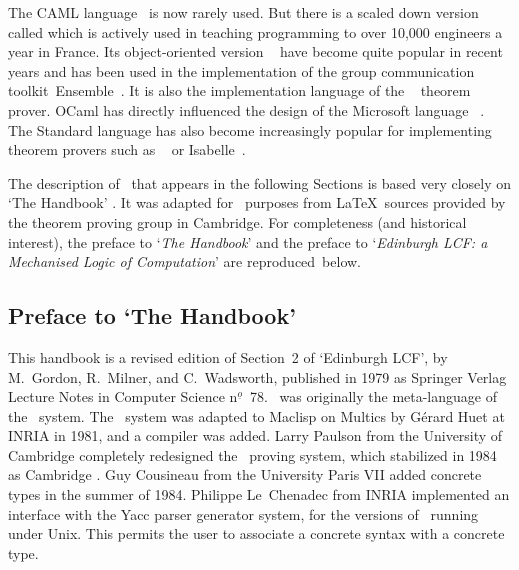 \documentclass[11pt]{article}
\begin{document}
The {\sf CAML} language~\cite{tr:CousineauHuet90a,tr:Weis+90a} is now rarely
used. But there is a scaled down version called  which is
actively used in teaching programming to over 10,000 engineers a year in France.
Its object-oriented version ~\cite{ma:Caml00a} have become
quite popular in recent years and has been used in the implementation of the
group communication toolkit~{\sf Ensemble}~\cite{Hayden:98a,Birman+al:2000a}.
It is also the implementation language of the
{\COQ}~\cite{Bertot+Casteran:2004} theorem prover.
{\sf OCaml} has directly influenced the design of the Microsoft
language {\FSHARP}~\cite{Syme+Granicz+Cisternino:2007}.
The Standard {\ML} language has also become increasingly popular for
implementing theorem provers such as {\HOL}~\cite{Gordon+Melham:93a} or {\sf
Isabelle}~\cite{inc:Paulson90a}.

The description of \ML\ that appears in the following Sections
is based very closely on `The {\ML} Handbook'
\cite{mi:ml-handbook84a}.  It was adapted for \Nuprl\ purposes from \LaTeX\
sources provided by the {\HOL} theorem proving group in Cambridge.  For
completeness (and historical interest), the preface to `{\em The {\ML}
Handbook\/}' and the preface to `{\em Edinburgh LCF: a Mechanised Logic of
Computation\/}' are reproduced~below.

\subsection{Preface to `The {\ML} Handbook'}

This handbook is a revised edition of Section~2 of `Edinburgh LCF', by
M.~Gordon, R.~Milner, and C.~Wadsworth, published in 1979 as Springer Verlag
Lecture Notes in Computer Science n$^{\underline{o}}$~78.  \ML\ was originally
the meta-language of the \LCF~system. The \ML\ system was adapted to Maclisp on
Multics by G\'erard Huet at {\small INRIA} in 1981, and a compiler was added.
Larry Paulson from the University of Cambridge completely redesigned the \LCF\
proving system, which stabilized in 1984 as Cambridge \LCF.  Guy Cousineau from
the University Paris VII added concrete types in the summer of 1984.  Philippe
Le~Chenadec from {\small INRIA} implemented an interface with the Yacc parser
generator system, for the versions of \ML\ running under Unix.  This permits the
user to associate a concrete syntax with a concrete type.
\end{document}
